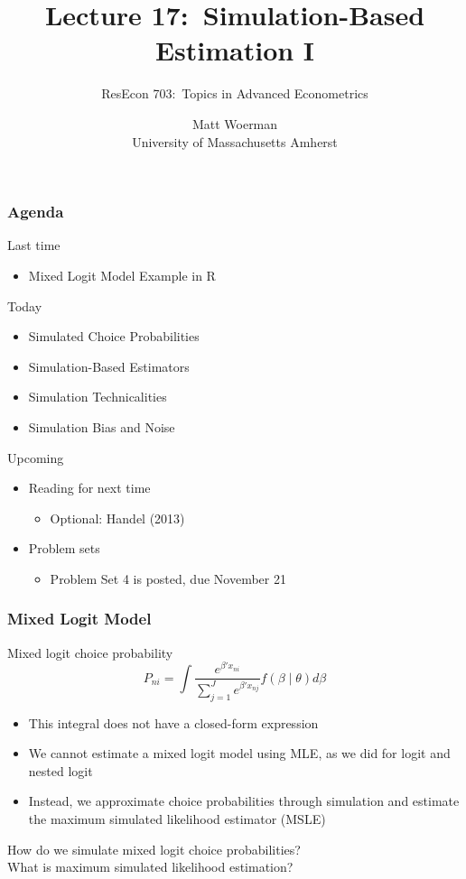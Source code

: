 \documentclass{beamer}
\title[Lecture 17:\ Simulation-Based Estimation I]{Lecture 17:\ Simulation-Based Estimation I}
\author[ResEcon 703:\ Advanced Econometrics]{ResEcon 703:\ Topics in Advanced Econometrics}
\date{Matt Woerman\\University of Massachusetts Amherst}
\begin{document}
{ 
\begin{frame}[noframenumbering]
    \titlepage
\end{frame}
}

\begin{frame}\frametitle{Agenda}
    Last time
    \begin{itemize}
        \item Mixed Logit Model Example in R
    \end{itemize}
    \vspace{2ex}
    Today
    \begin{itemize}
    	\item Simulated Choice Probabilities
        \item Simulation-Based Estimators
        \item Simulation Technicalities
        \item Simulation Bias and Noise
    \end{itemize}
    \vspace{2ex}
    Upcoming
    \begin{itemize}
        \item Reading for next time
        \begin{itemize}
            \item Optional: Handel (2013)
        \end{itemize}
        \item Problem sets
        \begin{itemize}
            \item Problem Set 4 is posted, due November 21
        \end{itemize}
    \end{itemize}
\end{frame}

\begin{frame}\frametitle{Mixed Logit Model}
    Mixed logit choice probability
    $$P_{ni} = \int \frac{e^{\beta' x_{ni}}}{\sum_{j = 1}^J e^{\beta' x_{nj}}} f(\beta \mid \theta) d \beta$$
    \begin{itemize}
        \item This integral does not have a closed-form expression
        \item We cannot estimate a mixed logit model using MLE, as we did for logit and nested logit
        \item Instead, we approximate choice probabilities through simulation and estimate the maximum simulated likelihood estimator (MSLE)
    \end{itemize}
    \vspace{2ex}
    How do we simulate mixed logit choice probabilities? \\
    \vspace{2ex}
    What is maximum simulated likelihood estimation?
\end{frame}
\end{document}

